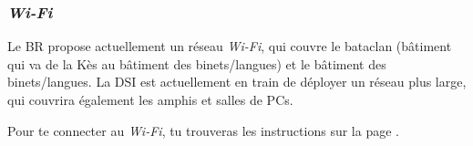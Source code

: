 \subsubsection{\emph{Wi-Fi}}
\label{wifi} 
Le BR propose actuellement un réseau \emph{Wi-Fi}, qui couvre le bataclan (bâtiment qui va de la Kès au bâtiment des
binets/langues) et le bâtiment des binets/langues. La DSI est actuellement en train de déployer un réseau plus large, qui couvrira également les amphis et salles de PCs.

 Pour te connecter au \emph{Wi-Fi}, tu trouveras les instructions sur la page .




